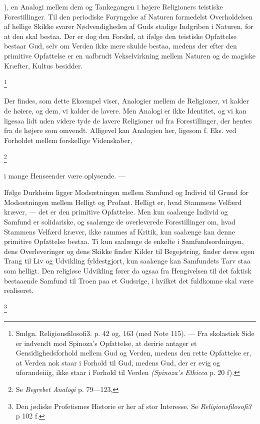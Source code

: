 \documentclass[12pt]{article}
\newcommand{\apage}[1]{\marginnote{\footnotesize\textit{[#1]}}}
\begin{document}
      ), en Analogi mellem dem
\setcounter{footnote}{0}%
\apage{108}og Tankegangen i højere Religioners teistiske Forestillinger. Til
den periodiske Foryngelse af Naturen formedelst Overholdelsen af hellige Skikke
svarer Nødvendigheden af Guds stadige Indgriben i Naturen, for at den skal
bestaa. Der er dog den Forskel, at ifølge den teistiske Opfattelse bestaar Gud,
selv om \guillemotright{}Verden\guillemotleft{} ikke mere skulde bestaa, medens
der efter den primitive Opfattelse er en uafbrudt Vekselvirkning mellem Naturen
og de magiske Kræfter, Kultus besidder.

         \footnote{Smlgn. Religionsfilosofi3. p. 42 og, 163 (med Note 115). ---
Fra skolastisk Side er indvendt mod Spinoza's Opfattelse, at deririe antager et
Gensidighedsforhold mellem Gud og Verden, medens den rette Opfattelse er, at
Verden nok staar i Forhold til Gud, medens Gud, der er evig og uforandeiiig,
ikke staar i Forhold til Verden \textit{(Spinoza's Ethicca }p. 20 f).}

Der findes, som dette Eksempel viser, Analogier mellem de Religioner, vi kalder
de høiere, og dem, vi kalder de lavere. Men Analogi er ikke Identitet, og vi
kan ligesaa lidt uden videre tyde de lavere Religioner ud fra Forestillinger,
der hentes fra de højere som omvendt. Alligevel kan Analogien her, ligesom f.
Eks. ved Forholdet mellem forskellige Videnskaber,

         \footnote{Se \textit{Begrebet Analogi }p. 79---123,}

       i mange Henseender være oplysende. ---

Ifølge Durkheim ligger Modsætningen mellem Samfund og Individ til Grund for
Modsætningen mellem Helligt og Profant. Helligt er, hvad Stammens Velfærd
kræver, --- det er den primitive Opfattelse. Men kun saalænge Individ og
Samfund er solidariske, og saalænge de overleverede Forestillinger om, hvad
Stammens Velfærd kræver, ikke rammes af Kritik, kun saalænge kan denne
primitive Opfattelse bestaa. Ti kun saalænge de enkelte i Samfundsordningen,
dens Overleveringer og dens Skikke finder Kilder
\setcounter{footnote}{0}%
\apage{109}til Begejstring, finder deres egen Trang til Liv og Udvikling
fyldestgjort, kun saalænge kan Samfundets Tarv staa som helligt. Den religiøse
Udvikling fører da ogsaa fra Hengivelsen til det faktisk bestaaende Samfund til
Troen paa et Gudsrige, i hvilket det fuldkomne skal være realiseret.

         \footnote{Den jødiske Profetismes Historie er her af stor Interesse.
Se \textit{Religionsfilosofi3 }p 102 f.}
\end{document}
